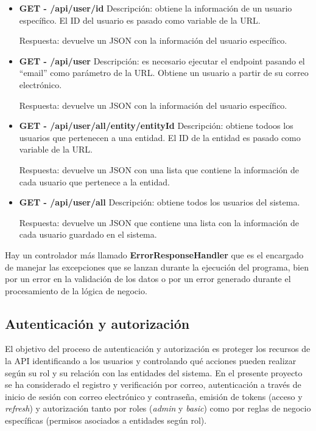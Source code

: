 \begin{itemize}
\begin{itemize}
        Respuesta: devuelve un JSON con la información del usuario que lo ha ejecutado.

        \item \textbf{GET - /api/user/{id}} \newline
        Descripción: obtiene la información de un usuario específico. El ID del usuario es pasado como variable de la URL.

        Respuesta: devuelve un JSON con la información del usuario específico.

        \item \textbf{GET - /api/user} \newline
        Descripción: es necesario ejecutar el endpoint pasando el ``email'' como parámetro de la URL. Obtiene un usuario a partir de su correo
        electrónico.

        Respuesta: devuelve un JSON con la información del usuario específico.

        \item \textbf{GET - /api/user/all/entity/{entityId}} \newline
        Descripción: obtiene todoos los usuarios que pertenecen a una entidad. El ID de la entidad es pasado como variable de la URL.

        Respuesta: devuelve un JSON con una lista que contiene la información de cada usuario que pertenece a la entidad.

        \item \textbf{GET - /api/user/all} \newline
        Descripción: obtiene todos los usuarios del sistema.

        Respuesta: devuelve un JSON que contiene una lista con la información de cada usuario guardado en el sistema.
    \end{itemize}
\end{itemize}

Hay un controlador más llamado \textbf{ErrorResponseHandler} que es el encargado de manejar las excepciones que se lanzan durante la 
ejecución del programa, bien por un error en la validación de los datos o por un error generado durante el procesamiento de la lógica 
de negocio.

\subsection{Autenticación y autorización}

El objetivo del proceso de autenticación y autorización es proteger los recursos de la API identificando a los usuarios y controlando qué 
acciones pueden realizar según su rol y su relación con las entidades del sistema. En el presente proyecto se ha considerado el registro y 
verificación por correo, autenticación a través de inicio de sesión con correo electrónico y contraseña, emisión de tokens (acceso y 
\textit{refresh}) y autorización tanto por roles (\textit{admin} y \textit{basic}) como por reglas de negocio específicas (permisos asociados
a entidades según rol).

